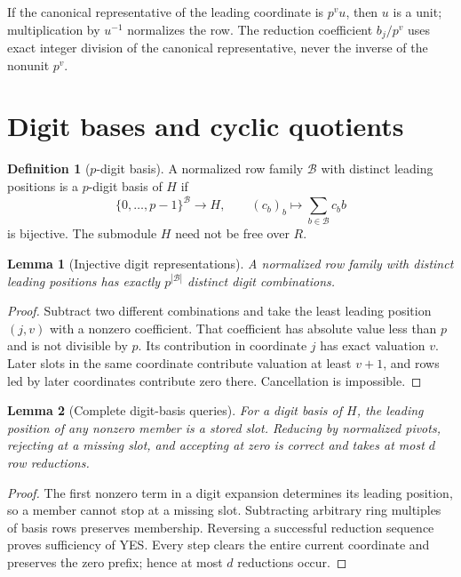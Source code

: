 \documentclass[11pt,a4paper]{article}
\theoremstyle{definition}
\newtheorem{definition}{Definition}
\theoremstyle{plain}
\newtheorem{lemma}{Lemma}
\begin{document}
If the canonical representative of the leading coordinate is $p^v u$, then $u$ is a unit;
multiplication by $u^{-1}$ normalizes the row. The reduction coefficient $b_j/p^v$ uses exact
integer division of the canonical representative, never the inverse of the nonunit $p^v$.

\section{Digit bases and cyclic quotients}
\begin{definition}[$p$-digit basis]\label{def:digit}
A normalized row family $\mathcal B$ with distinct leading positions is a $p$-digit basis of $H$ if
\[
 \{0,\ldots,p-1\}^{\mathcal B}\longrightarrow H,
 \qquad(c_b)_b\longmapsto\sum_{b\in\mathcal B}c_b b
\]
is bijective. The submodule $H$ need not be free over $R$.
\end{definition}

\begin{lemma}[Injective digit representations]\label{lem:digits}
A normalized row family with distinct leading positions has exactly $p^{|\mathcal B|}$ distinct
digit combinations.
\end{lemma}
\begin{proof}
Subtract two different combinations and take the least leading position $(j,v)$ with a nonzero
coefficient. That coefficient has absolute value less than $p$ and is not divisible by $p$.
Its contribution in coordinate $j$ has exact valuation $v$. Later slots in the same coordinate
contribute valuation at least $v+1$, and rows led by later coordinates contribute zero there.
Cancellation is impossible.
\end{proof}

\begin{lemma}[Complete digit-basis queries]\label{lem:query}
For a digit basis of $H$, the leading position of any nonzero member is a stored slot.
Reducing by normalized pivots, rejecting at a missing slot, and accepting at zero is correct
and takes at most $d$ row reductions.
\end{lemma}
\begin{proof}
The first nonzero term in a digit expansion determines its leading position, so a member cannot
stop at a missing slot. Subtracting arbitrary ring multiples of basis rows preserves membership.
Reversing a successful reduction sequence proves sufficiency of YES. Every step clears the entire
current coordinate and preserves the zero prefix; hence at most $d$ reductions occur.
\end{proof}
\end{document}

